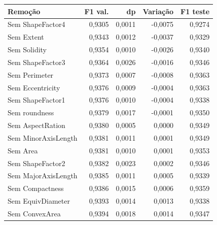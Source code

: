 \begin{tabular}{lrrrr}
\toprule
Remoção & F1 val. & dp & Variação & F1 teste \\
\midrule
Sem ShapeFactor4 & 0,9305 & 0,0011 & -0,0075 & 0,9274 \\
Sem Extent & 0,9343 & 0,0012 & -0,0037 & 0,9329 \\
Sem Solidity & 0,9354 & 0,0010 & -0,0026 & 0,9340 \\
Sem ShapeFactor3 & 0,9364 & 0,0026 & -0,0016 & 0,9346 \\
Sem Perimeter & 0,9373 & 0,0007 & -0,0008 & 0,9363 \\
Sem Eccentricity & 0,9376 & 0,0009 & -0,0004 & 0,9363 \\
Sem ShapeFactor1 & 0,9376 & 0,0010 & -0,0004 & 0,9338 \\
Sem roundness & 0,9379 & 0,0017 & -0,0001 & 0,9350 \\
Sem AspectRation & 0,9380 & 0,0005 & 0,0000 & 0,9349 \\
Sem MinorAxisLength & 0,9381 & 0,0011 & 0,0001 & 0,9349 \\
Sem Area & 0,9381 & 0,0010 & 0,0001 & 0,9353 \\
Sem ShapeFactor2 & 0,9382 & 0,0023 & 0,0002 & 0,9346 \\
Sem MajorAxisLength & 0,9385 & 0,0011 & 0,0005 & 0,9339 \\
Sem Compactness & 0,9386 & 0,0015 & 0,0006 & 0,9359 \\
Sem EquivDiameter & 0,9393 & 0,0014 & 0,0013 & 0,9338 \\
Sem ConvexArea & 0,9394 & 0,0018 & 0,0014 & 0,9347 \\
\bottomrule
\end{tabular}
